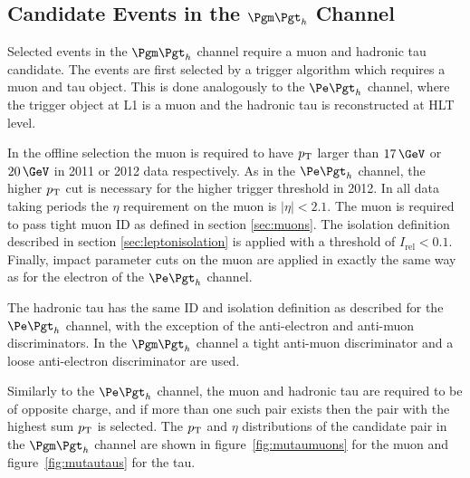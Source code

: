 \subsection{Candidate Events in the $\mutau$ Channel}

Selected events in the $\mutau$ channel require a muon and hadronic tau
candidate. The events are first selected by a trigger algorithm which requires
a muon and tau object. This is done analogously to the $\etau$ channel,
where the trigger object at \ac{L1} is a muon and the hadronic tau is
reconstructed at \ac{HLT} level.

In the offline selection the muon is required to have $p_{\mathrm{T}}$ larger than
$17\,\GeV$ or $20\,\GeV$ in 2011 or 2012 data respectively. 
As in the $\etau$ channel, the higher $p_{\mathrm{T}}$ cut is necessary for the
higher trigger threshold in 2012. In all data taking periods the $\eta$ requirement
on the muon is $|\eta| < 2.1$. The muon is required to pass tight muon ID as
defined in section \ref{sec:muons}. The isolation definition described in 
section \ref{sec:leptonisolation} is
applied with a threshold of $I_{\text{rel}} < 0.1$. Finally, impact parameter cuts on the muon are
applied in exactly the same way as for the electron of the $\etau$ channel.

The hadronic tau has the same ID and isolation definition as described for the $\etau$
channel, with the exception of the anti-electron and anti-muon discriminators.
In the $\mutau$ channel a tight anti-muon discriminator and a loose
anti-electron discriminator are used. 

Similarly to the $\etau$ channel, the muon and hadronic tau are required to be of 
opposite charge, and if more than one such pair exists then the pair with the highest sum $p_{\mathrm{T}}$
is selected. The $p_{\mathrm{T}}$ and $\eta$ distributions of the candidate pair in the
$\mutau$ channel are shown in figure~\ref{fig:mutaumuons} for the muon and
figure~\ref{fig:mutautaus} for the tau. 


